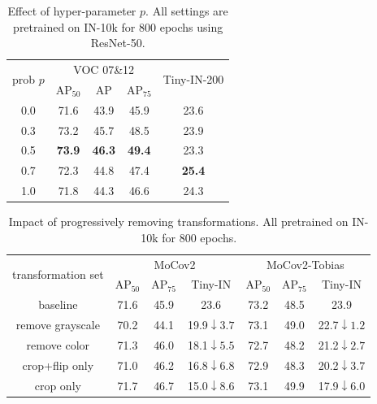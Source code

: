 \documentclass[letterpaper]{article} %
\def\pt{\phantom{0}}
\begin{document}
\begin{table}
	\caption{Effect of hyper-parameter $p$. All settings are pretrained on IN-10k for 800 epochs using ResNet-50.}
	\label{tab:hyperparameter}
	\centering
	\small
	\renewcommand{\arraystretch}{0.9}
	\renewcommand{\multirowsetup}{\centering}
	\begin{tabular}{c|ccc|c}
		\hline
		\multirow{2}{*}{prob $p$}         &           \multicolumn{3}{c|}{VOC 07\&12}    &\multirow{2}{*}{Tiny-IN-200}         \\
		\cline{2-4}
		& $\text{AP}_{50}$ & $\text{AP}$ & $\text{AP}_{75}$ &\\
		\hline
		0.0	 &     71.6      &  43.9       &  45.9      &  23.6    \\
		0.3	 &     73.2     &  45.7       &  48.5      &  23.9    \\
		0.5	 &     \textbf{73.9}     &  \textbf{46.3}       &  \textbf{49.4}      &  23.3    \\
		0.7	 &     72.3     &  44.8       &  47.4      &  \textbf{25.4}    \\
		1.0 &       71.8      & 44.3&46.6&24.3\\
		\hline
	\end{tabular}
\end{table}

\begin{table}
	\caption{Impact of progressively removing transformations. All pretrained on IN-10k for 800 epochs.}
	\label{tab:transformation}
	\centering
	\small
	\setlength{\tabcolsep}{2pt}
	\renewcommand{\arraystretch}{0.95}
	\renewcommand{\multirowsetup}{\centering}
	\begin{tabular}{c|ccc|ccc}
		\hline
		\multirow{2}{*}{transformation set}         &           \multicolumn{3}{c|}{MoCov2}    &\multicolumn{3}{c}{MoCov2-Tobias}         \\
		\cline{2-7}
		& $\text{AP}_{50}$ &  $\text{AP}_{75}$ &Tiny-IN & $\text{AP}_{50}$ & $\text{AP}_{75}$ &Tiny-IN\\
		\hline
		baseline	 &     71.6          &   45.9      &   23.6\tiny{\pt\pt\pt\pt\pt} &73.2&48.5&23.9\tiny{\pt\pt\pt\pt\pt} \\
		remove grayscale	 &   70.2          &   44.1    &      19.9\tiny$\downarrow3.7$&73.1&49.0&22.7\tiny$\downarrow1.2$\\
		remove color 	 &   71.3            &  46.0       &18.1\tiny$\downarrow5.5$   &72.7&48.2&21.2\tiny$\downarrow2.7$ \\
		crop+flip only &    71.0   &46.2 & 16.8\tiny$\downarrow6.8$&72.9&48.3& 20.2\tiny$\downarrow3.7$\\
		crop only &71.7&46.7&15.0\tiny$\downarrow8.6$&73.1&49.9&17.9\tiny$\downarrow6.0$\\
		\hline
	\end{tabular}
\end{table}
\end{document}
